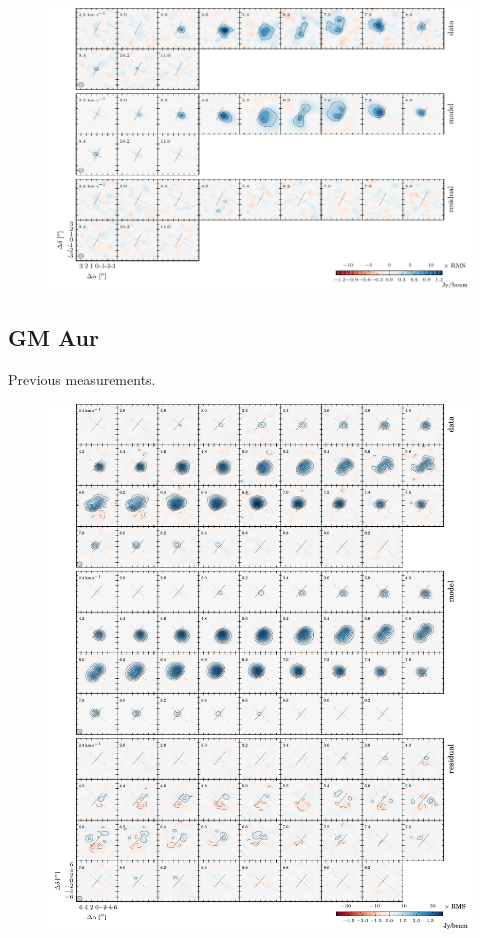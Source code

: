 \documentclass{aastex6}
\begin{document}
\begin{figure}[htb]
\begin{center}
  \includegraphics{LkCa15.pdf}
  \end{center}
\end{figure}

\subsection{GM Aur}
Previous measurements.

\begin{figure}[htb]
\begin{center}
  \includegraphics{GMAur.pdf}
  \end{center}
\end{figure}
\end{document}
